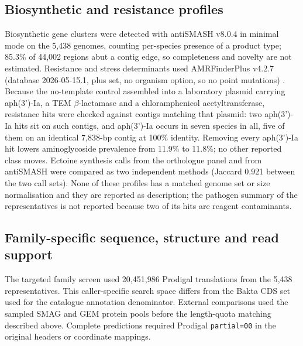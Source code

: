 \subsection*{Biosynthetic and resistance profiles}
Biosynthetic gene clusters were detected with antiSMASH v8.0.4 \citep{blin2025antismash8} in minimal
mode on the 5{,}438 genomes, counting per-species presence of a product type; 85.3\% of 44{,}002
regions abut a contig edge, so completeness and novelty are not estimated. Resistance and stress
determinants used AMRFinderPlus v4.2.7 (database 2026-05-15.1, plus set, no organism option, so no
point mutations) \citep{feldgarden2021amrfinderplus}. Because the no-template control assembled into a
laboratory plasmid carrying aph(3')-Ia, a TEM $\beta$-lactamase and a chloramphenicol
acetyltransferase, resistance hits were checked against contigs matching that plasmid: two
aph(3')-Ia hits sit on such contigs, and aph(3')-Ia occurs in seven species in all, five of them on
an identical 7{,}838-bp contig at 100\% identity. Removing every aph(3')-Ia hit lowers aminoglycoside
prevalence from 11.9\% to 11.8\%; no other reported class moves. Ectoine synthesis calls from the orthologue
panel and from antiSMASH were compared as two independent methods (Jaccard 0.921 between the two call sets). None of these profiles has a
matched genome set or size normalisation and they are reported as description; the pathogen summary
of the representatives is not reported because two of its hits are reagent contaminants.

\subsection*{Family-specific sequence, structure and read support}
The targeted family screen used 20{,}451{,}986 Prodigal translations from the 5{,}438 representatives. This caller-specific search space differs from the Bakta CDS set used for the catalogue annotation denominator. External comparisons used the sampled SMAG and GEM protein pools before the length-quota matching described above. Complete predictions required Prodigal \texttt{partial=00} in the original headers or coordinate mappings.

